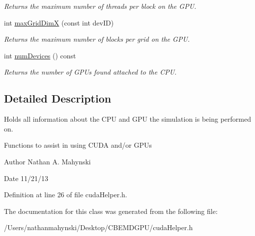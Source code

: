 \begin{DoxyCompactItemize}
\begin{DoxyCompactList}\small\item\em Returns the maximum number of threads per block on the G\-P\-U. \end{DoxyCompactList}\item 
\hypertarget{classsystem_props_a3327d282f881885ebcb8949d8ec6e3ec}{int \hyperlink{classsystem_props_a3327d282f881885ebcb8949d8ec6e3ec}{max\-Grid\-Dim\-X} (const int dev\-I\-D)}\label{classsystem_props_a3327d282f881885ebcb8949d8ec6e3ec}

\begin{DoxyCompactList}\small\item\em Returns the maximum number of blocks per grid on the G\-P\-U. \end{DoxyCompactList}\item 
\hypertarget{classsystem_props_a1cb3107e255e38046372edc757ddc6b2}{int \hyperlink{classsystem_props_a1cb3107e255e38046372edc757ddc6b2}{num\-Devices} () const }\label{classsystem_props_a1cb3107e255e38046372edc757ddc6b2}

\begin{DoxyCompactList}\small\item\em Returns the number of G\-P\-Us found attached to the C\-P\-U. \end{DoxyCompactList}\end{DoxyCompactItemize}


\subsection{Detailed Description}
Holds all information about the C\-P\-U and G\-P\-U the simulation is being performed on. 

Functions to assist in using C\-U\-D\-A and/or G\-P\-Us \begin{DoxyAuthor}{Author}
Nathan A. Mahynski 
\end{DoxyAuthor}
\begin{DoxyDate}{Date}
11/21/13 
\end{DoxyDate}


Definition at line 26 of file cuda\-Helper.\-h.



The documentation for this class was generated from the following file\-:\begin{DoxyCompactItemize}
\item 
/\-Users/nathanmahynski/\-Desktop/\-C\-B\-E\-M\-D\-G\-P\-U/cuda\-Helper.\-h\end{DoxyCompactItemize}
